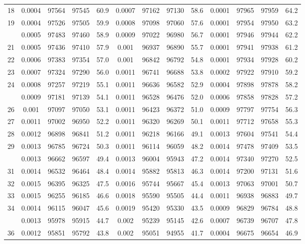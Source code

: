 \documentclass[
  14pt,
]{article}
\begin{document}
\begin{longtable}[t]{lcccccccccccc}
18 & 0.0004 & 97564 & 97545 & 60.9 & 0.0007 & 97162 & 97130 & 58.6 & 0.0001 & 97965 & 97959 & 64.2\\
19 & 0.0004 & 97526 & 97505 & 59.9 & 0.0008 & 97098 & 97060 & 57.6 & 0.0001 & 97954 & 97950 & 63.2\\
\addlinespace
20 & 0.0005 & 97483 & 97460 & 58.9 & 0.0009 & 97022 & 96980 & 56.7 & 0.0001 & 97946 & 97944 & 62.2\\
21 & 0.0005 & 97436 & 97410 & 57.9 & 0.001 & 96937 & 96890 & 55.7 & 0.0001 & 97941 & 97938 & 61.2\\
22 & 0.0006 & 97383 & 97354 & 57.0 & 0.001 & 96842 & 96792 & 54.8 & 0.0001 & 97934 & 97928 & 60.2\\
23 & 0.0007 & 97324 & 97290 & 56.0 & 0.0011 & 96741 & 96688 & 53.8 & 0.0002 & 97922 & 97910 & 59.2\\
24 & 0.0008 & 97257 & 97219 & 55.1 & 0.0011 & 96636 & 96582 & 52.9 & 0.0004 & 97898 & 97878 & 58.2\\
\addlinespace
25 & 0.0009 & 97181 & 97139 & 54.1 & 0.0011 & 96528 & 96476 & 52.0 & 0.0006 & 97858 & 97828 & 57.2\\
26 & 0.001 & 97097 & 97050 & 53.1 & 0.0011 & 96423 & 96372 & 51.0 & 0.0009 & 97797 & 97754 & 56.3\\
27 & 0.0011 & 97002 & 96950 & 52.2 & 0.0011 & 96320 & 96269 & 50.1 & 0.0011 & 97712 & 97658 & 55.3\\
28 & 0.0012 & 96898 & 96841 & 51.2 & 0.0011 & 96218 & 96166 & 49.1 & 0.0013 & 97604 & 97541 & 54.4\\
29 & 0.0013 & 96785 & 96724 & 50.3 & 0.0011 & 96114 & 96059 & 48.2 & 0.0014 & 97478 & 97409 & 53.5\\
\addlinespace
30 & 0.0013 & 96662 & 96597 & 49.4 & 0.0013 & 96004 & 95943 & 47.2 & 0.0014 & 97340 & 97270 & 52.5\\
31 & 0.0014 & 96532 & 96464 & 48.4 & 0.0014 & 95882 & 95813 & 46.3 & 0.0014 & 97200 & 97131 & 51.6\\
32 & 0.0015 & 96395 & 96325 & 47.5 & 0.0016 & 95744 & 95667 & 45.4 & 0.0013 & 97063 & 97001 & 50.7\\
33 & 0.0015 & 96255 & 96185 & 46.6 & 0.0018 & 95590 & 95505 & 44.4 & 0.0011 & 96938 & 96883 & 49.7\\
34 & 0.0014 & 96115 & 96047 & 45.6 & 0.0019 & 95420 & 95330 & 43.5 & 0.0009 & 96829 & 96784 & 48.8\\
\addlinespace
35 & 0.0013 & 95978 & 95915 & 44.7 & 0.002 & 95239 & 95145 & 42.6 & 0.0007 & 96739 & 96707 & 47.8\\
36 & 0.0012 & 95851 & 95792 & 43.8 & 0.002 & 95051 & 94955 & 41.7 & 0.0004 & 96675 & 96654 & 46.9\\

\end{longtable}
\end{document}
